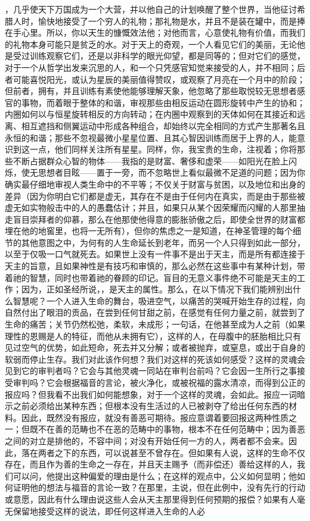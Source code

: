 ，几乎使天下万国成为一个大营，并以他自己的计划唤醒了整个世界，当他征讨希腊人时，愉快地接受了一个穷人的礼物；那礼物是水，并且不是装在罐中，而是捧在手心里。所以，你以天生的慷慨效法他；对他而言，心意使礼物有价值，而我们的礼物本身可能只是贫乏的水。对于天上的奇观，一个人看见它们的美丽，无论他是受过训练观察它们，还是以非科学的眼光仰望，都是同等的；但对它们的感觉，对于一个从哲学出发来沉思的人，和一个只凭感官知觉来接受的人，并不相同；后者可能喜悦阳光，或认为星辰的美丽值得赞叹，或观察了月亮在一个月中的阶段；但前者，拥有，并且训练有素使他能够理解天象，他忽略了那些取悦较无思想者感官的事物，而着眼于整体的和谐，审视那些由相反运动在圆形旋转中产生的协和；内圈如何以与恒星旋转相反的方向转动；在内圈中观察到的天体如何在其接近和远离、相互遮挡和侧翼运动中形成各种组合，却始终以完全相同的方式产生那著名且永恒的和谐；那些不忽视最微小星星位置、且其心智因训练而居于上界的人，能意识到这一点，他们同样关注所有星星。同样，你，我宝贵的生命，注视着；你将那些不断占据群众心智的物体——我指的是财富、奢侈和虚荣——如阳光在脸上闪烁，使无思想者目眩——置于一旁，而不忽略世上看似最微不足道的问题；因为你确实最仔细地审视人类生命中的不平等；不仅关于财富与贫困，以及地位和出身的差异（因为你明白它们都是虚无，其存在不是由于任何内在真实，而是由于那些被虚无如实物般击中的人的愚蠢估计；并且，如果只从某个因荣耀而闪耀的人那里抽走盲目崇拜者的仰慕，那么在他那使他得意的膨胀骄傲之后，即使全世界的财富都埋在他的地窖里，也将一无所有），但你的焦虑之一是知道，在神圣管理的每个细节的其他意图之中，为何有的人生命延长到老年，而另一个人只得到如此一部分，以至于仅吸一口气就死去。如果世上没有一件事不是出于天主，而是所有都连接于天主的旨意，且如果神性是有技巧和审慎的，那么必然在这些事中有某种计划，带着祂的智慧，同时也带着祂的眷顾的印记。盲目的无意义事件绝不可能是天主的工作；因为，正如圣经所说，，是天主的属性。那么，在以下情况下我们能辨别出什么智慧呢？一个人进入生命的舞台，吸进空气，以痛苦的哭喊开始生存的过程，向自然付出了眼泪的贡品，在尝到任何甘甜之前，在感觉有任何力量之前，就尝到了生命的痛苦；关节仍然松弛，柔软，未成形；一句话，在他甚至成为人之前（如果理性的恩赐是人的特征，而他从未拥有它），这样的人，在母腹中的胚胎相比只有见过空气的优势，如此短命，死去并又分解；或者被抛弃，或窒息，或出于自身的软弱而停止生存。我们对此该作何想？我们对这样的死该如何感受？这样的灵魂会见到它的审判者吗？它会与其他灵魂一同站在审判台前吗？它会因一生所行之事接受审判吗？它会根据福音的言论，被火净化，或被祝福的露水清凉，而得到公正的报应吗？但我看不出我们如何能想象，对于一个这样的灵魂，会如此。报应一词暗示之前必须给出某种东西；但根本没有生活过的人已被剥夺了给出任何东西的材料。因此，既然没有报应，就没有善恶可期待。报应意谓着要回报这两种性质之一；但既不在善的范畴也不在恶的范畴中的事物，根本不在任何范畴中；因为善恶之间的对立是排他的，不容中间；对没有开始任何一方的人，两者都不会来。因此，落在两者之下的东西，可以说甚至不曾存在。但如果有人说，这样的生命不仅存在，而且作为善的生命之一存在，并且天主赐予（而非偿还）善给这样的人，我们可以问，他提出这种偏爱的理由是什么；在这样的观点中，公义如何显明；他如何证明他的想法与福音的言论一致？在那里，主说，但在此例中，没有先行的行动或意愿，因此有什么理由说这些人会从天主那里得到任何预期的报偿？如果有人毫无保留地接受这样的说法，即任何这样进入生命的人必